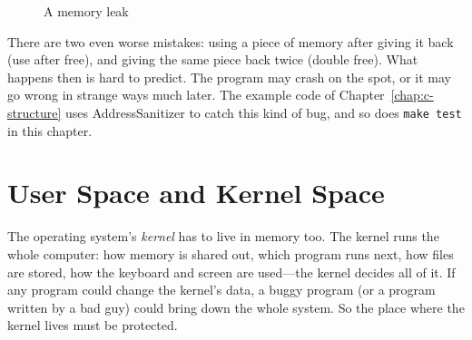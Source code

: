 \begin{figure}[htbp]
  \centering
  \caption{A memory leak}
  \label{fig:leak}
\end{figure}

There are two even worse mistakes: using a piece of memory after giving it back (use after free), and giving the same piece back twice (double free). What happens then is hard to predict. The program may crash on the spot, or it may go wrong in strange ways much later. The example code of Chapter~\ref{chap:c-structure} uses AddressSanitizer to catch this kind of bug, and so does \texttt{make test} in this chapter.

\section{User Space and Kernel Space}
\label{sec:kernel-space}

The operating system's \emph{kernel} has to live in memory too. The kernel runs the whole computer: how memory is shared out, which program runs next, how files are stored, how the keyboard and screen are used---the kernel decides all of it. If any program could change the kernel's data, a buggy program (or a program written by a bad guy) could bring down the whole system. So the place where the kernel lives must be protected.

